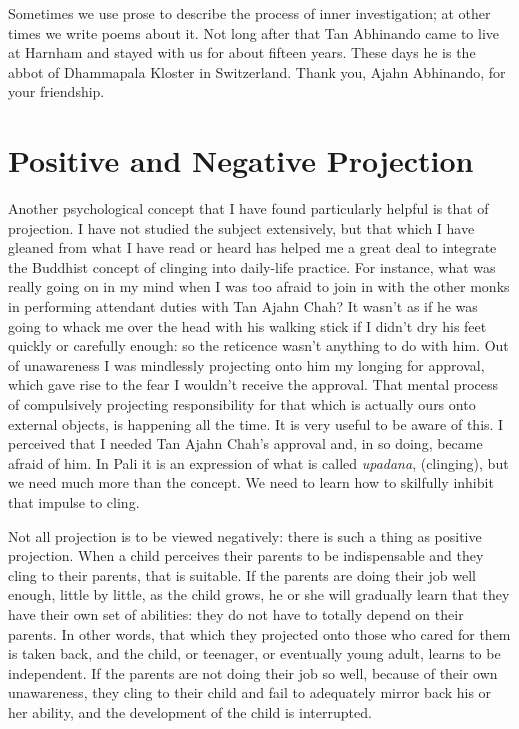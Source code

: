 Sometimes we use prose to describe the process of inner investigation;
at other times we write poems about it. Not long after that Tan
Abhinando came to live at Harnham and stayed with us for about fifteen
years. These days he is the abbot of Dhammapala Kloster in Switzerland.
Thank you, Ajahn Abhinando, for your friendship.

\section{Positive and Negative Projection}

Another psychological concept that I have found particularly helpful is
that of projection. I have not studied the subject extensively, but that
which I have gleaned from what I have read or heard has helped me a
great deal to integrate the Buddhist concept of clinging into daily-life
practice. For instance, what was really going on in my mind when I was
too afraid to join in with the other monks in performing attendant
duties with Tan Ajahn Chah? It wasn't as if he was going to whack me
over the head with his walking stick if I didn't dry his feet quickly or
carefully enough: so the reticence wasn't anything to do with him. Out
of unawareness I was mindlessly projecting onto him my longing for
approval, which gave rise to the fear I wouldn't receive the approval.
That mental process of compulsively projecting responsibility for that
which is actually ours onto external objects, is happening all the time.
It is very useful to be aware of this. I perceived that I needed Tan Ajahn
Chah's approval and, in so doing, became afraid of him. In Pali it is an
expression of what is called \emph{upadana}, (clinging), but we need
much more than the concept. We need to learn how to skilfully inhibit
that impulse to cling.

Not all projection is to be viewed negatively: there is such a thing as
positive projection. When a child perceives their parents to be
indispensable and they cling to their parents, that is suitable. If the
parents are doing their job well enough, little by little, as the child
grows, he or she will gradually learn that they have their own set of
abilities: they do not have to totally depend on their parents. In other
words, that which they projected onto those who cared for them is taken
back, and the child, or teenager, or eventually young adult, learns to
be independent. If the parents are not doing their job so well, because
of their own unawareness, they cling to their child and fail to
adequately mirror back his or her ability, and the development of the
child is interrupted.

